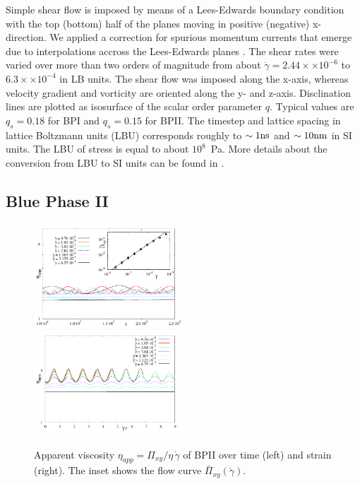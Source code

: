 \documentclass[aps,pre,reprint,superscriptaddress, twocolumn]{revtex4}
\newcommand{\e}[1]{\times10^{#1}}
\newcommand{\gd}{\dot{\gamma}}
\begin{document}
Simple shear flow is imposed by means of a Lees-Edwards boundary condition ~\cite{Wagner:2002} with
the top (bottom) half of the planes moving in positive (negative) x-direction.
We applied a correction for spurious momentum currents that emerge due to interpolations accross 
the Lees-Edwards planes \cite{Henrich:2012a}.
The shear rates were varied over more than two orders of magnitude from about 
$\gd=2.44\times \e{-6}$ to $6.3\times\e{-4}$ in LB units.
The shear flow was imposed along the x-axis, whereas velocity gradient and vorticity are oriented 
along the y- and z-axis.
Disclination lines are plotted as isosurface of the scalar order parameter $q$. Typical values 
are $q_s=0.18$ for BPI and $q_s=0.15$ for BPII.
The timestep and lattice spacing in lattice Boltzmann units (LBU) corresponds roughly to
$\sim 1 {\rm ns}$ and $\sim 10{\rm nm}$ in SI units. The LBU of stress
is equal to about $10^8$~Pa.
More details about the conversion from LBU to SI units can be found in
\cite{Henrich:2011a,Henrich:2010b}.

\subsection{Blue Phase II}

\begin{figure}[htpb]
\includegraphics[width=0.495\textwidth]{stress_bp2.pdf}
\includegraphics[width=0.495\textwidth]{stress_vs_strain_bp2.pdf}
\caption{Apparent viscosity $\eta_{app}=\Pi_{xy}/\eta\,\gd$ of BPII over time (left) and strain (right). The inset shows the flow curve $\bar{\Pi}_{xy}(\gd)$.}
\label{bp2-rheo}
\end{figure}
\end{document}

